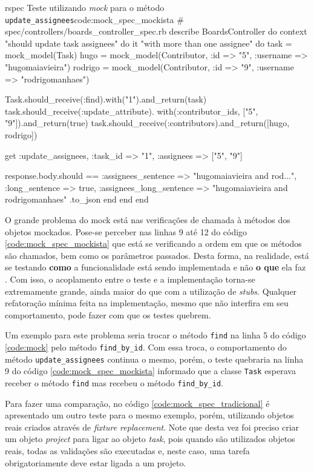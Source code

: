\begin{mycode}{rspec}%
{Teste utilizando \textit{mock} para o método \texttt{update\_assignees}}{code:mock_spec_mockista}
# spec/controllers/boards_controller_spec.rb
describe BoardsController do
  context "should update task assignees" do
    it "with more than one assignee" do
      task = mock_model(Task)
      hugo = mock_model(Contributor, :id => "5", :username => "hugomaiavieira")
      rodrigo = mock_model(Contributor, :id => "9", :username => "rodrigomanhaes")

      Task.should_receive(:find).with("1").and_return(task)
      task.should_receive(:update_attribute).
        with(:contributor_ids, ["5", "9"]).and_return(true)
      task.should_receive(:contributors).and_return([hugo, rodrigo])

      get :update_assignees, :task_id => "1", :assignees => ["5", "9"]

      response.body.should ==
        { :assignees_sentence => "hugomaiavieira and rod...",
          :long_sentence => true,
          :assignees_long_sentence => "hugomaiavieira and rodrigomanhaes" }.to_json
    end
  end
end
\end{mycode}

O grande problema do mock está nas verificações de chamada à métodos dos objetos mockados. Pose-se perceber nas linhas 9 até 12 do código \ref{code:mock_spec_mockista} que está se verificando a ordem em que os métodos são chamados, bem como os parâmetros passados. Desta forma, na realidade, está se testando \textbf{como} a funcionalidade está sendo implementada e não \textbf{o que} ela faz \cite{UnitForAReason}. Com isso, o acoplamento entre o teste e a implementação torna-se extremamente grande, ainda maior do que com a utilização de \textit{stubs}. Qualquer refatoração mínima feita na implementação, mesmo que não interfira em seu comportamento, pode fazer com que os testes quebrem.

Um exemplo para este problema seria trocar o método \texttt{find} na linha 5 do código \ref{code:mock} pelo método \texttt{find\_by\_id}. Com essa troca, o comportamento do método \texttt{update\_assignees} continua o mesmo, porém, o teste quebraria na linha 9 do código \ref{code:mock_spec_mockista} informado que a classe \texttt{Task} esperava receber o método \texttt{find} mas recebeu o método \texttt{find\_by\_id}.

Para fazer uma comparação, no código \ref{code:mock_spec_tradicional} é apresentado um outro teste para o mesmo exemplo, porém, utilizando objetos reais criados através de \textit{fixture replacement}. Note que desta vez foi preciso criar um objeto \textit{project} para ligar ao objeto \textit{task}, pois quando são utilizados objetos reais, todas as validações são executadas e, neste caso, uma tarefa obrigatoriamente deve estar ligada a um projeto.

